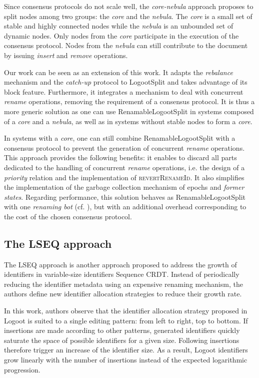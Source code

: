 \documentclass[10pt,journal,compsoc]{IEEEtran}
\newcommand{\ie}{i.e. }
\begin{document}
Since consensus protocols do not scale well, the \emph{core-nebula} approach proposes to split nodes among two groups: the \emph{core} and the \emph{nebula}.
The \emph{core} is a small set of stable and highly connected nodes while the \emph{nebula} is an unbounded set of dynamic nodes.
Only nodes from the \emph{core} participate in the execution of the consensus protocol.
Nodes from the \emph{nebula} can still contribute to the document by issuing \emph{insert} and \emph{remove} operations.

Our work can be seen as an extension of this work.
It adapts the \emph{rebalance} mechanism and the \emph{catch-up} protocol to LogootSplit and takes advantage of its block feature.
Furthermore, it integrates a mechanism to deal with concurrent \emph{rename} operations, removing the requirement of a consensus protocol.
It is thus a more generic solution as one can use RenamableLogootSplit in systems composed of a \emph{core} and a \emph{nebula}, as well as in systems without stable nodes to form a \emph{core}.

In systems with a \emph{core}, one can still combine RenamableLogootSplit with a consensus protocol to prevent the generation of concurrent \emph{rename} operations.
This approach provides the following benefits: it enables to discard all parts dedicated to the handling of concurrent \emph{rename} operations, \ie the design of a \emph{priority} relation and the implementation of \textsc{revertRenameId}.
It also simplifies the implementation of the garbage collection mechanism of epochs and \emph{former states}.
Regarding performance, this solution behaves as RenamableLogootSplit with one \emph{renaming bot} (cf. ), but with an additional overhead corresponding to the cost of the chosen consensus protocol.

\subsection{The LSEQ approach}

The LSEQ approach \cite{lseq2013, lseq2017} is another approach proposed to address the growth of identifiers in variable-size identifiers Sequence \ac{CRDT}. Instead of periodically reducing the identifier metadata using an expensive renaming mechanism, the authors define new identifier allocation strategies to reduce their growth rate.

In this work, authors observe that the identifier allocation strategy proposed in Logoot\cite{WeissICDCS09} is suited to a single editing pattern: from left to right, top to bottom.
If insertions are made according to other patterns, generated identifiers quickly saturate the space of possible identifiers for a given size.
Following insertions therefore trigger an increase of the identifier size.
As a result, Logoot identifiers grow linearly with the number of insertions instead of the expected logarithmic progression.
\end{document}

